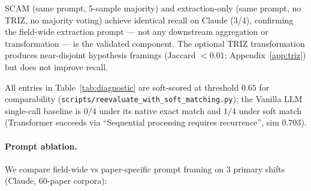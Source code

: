 \documentclass[11pt]{article}
\newcommand{\fpath}[1]{\mbox{}\nolinkurl{#1}}
\begin{document}
\begin{table}[t]
\centering
\caption{Diagnostic comparison on 4 primary shifts.}
\label{tab:diagnostic}
\footnotesize
\setlength{\tabcolsep}{4pt}
\end{table}

SCAM (same prompt, 5-sample majority) and extraction-only (same prompt, no TRIZ, no majority voting) achieve identical recall on Claude (3/4), confirming the field-wide extraction prompt --- not any downstream aggregation or transformation --- is the validated component. The optional TRIZ transformation produces near-disjoint hypothesis framings (Jaccard $< 0.01$; Appendix~\ref{app:triz}) but does not improve recall.

All entries in Table~\ref{tab:diagnostic} are soft-scored at threshold $0.65$ for comparability (\fpath{scripts/reevaluate_with_soft_matching.py}); the Vanilla LLM single-call baseline is $0/4$ under its native exact match and $1/4$ under soft match (Transformer succeeds via ``Sequential processing requires recurrence'', sim $0.703$).

\paragraph{Prompt ablation.}\label{sec:ablation}
We compare field-wide vs paper-specific prompt framing on 3 primary shifts (Claude, 60-paper corpora):
\end{document}
